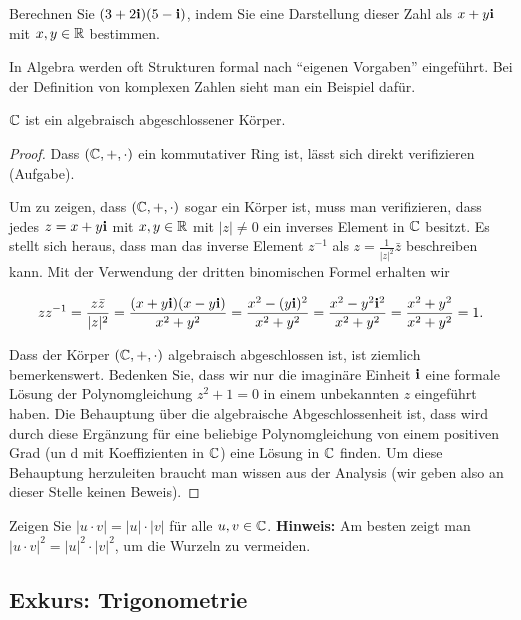 \begin{aufg}
	Berechnen Sie $(3+ 2 \mathbf{i}) ( 5 - \mathbf{i})$, indem Sie eine Darstellung dieser Zahl als $x+y \mathbf{i}$ mit $x, y \in \mathbb{R}$ bestimmen. 
\end{aufg} 

\begin{bem}
	In Algebra werden oft Strukturen formal nach ``eigenen Vorgaben'' eingeführt. Bei der Definition von komplexen Zahlen sieht man ein Beispiel dafür. 
\end{bem} 

\begin{thm}
		$\mathbb{C}$ ist ein algebraisch abgeschlossener Körper. 
\end{thm}
\begin{proof} 
	Dass $(\mathbb{C},+,\cdot)$ ein kommutativer Ring ist, lässt sich direkt verifizieren (Aufgabe). 
	
	Um zu zeigen, dass $(\mathbb{C},+,\cdot)$ sogar ein Körper ist, muss man verifizieren, dass jedes $z = x + y \mathbf{i}$ mit $x, y \in \mathbb{R}$ mit $|z| \ne 0$ ein inverses Element in $\mathbb{C}$ besitzt. Es stellt sich heraus, dass man das inverse Element $z^{-1}$ als $z = \frac{1}{|z|^2} \bar{z}$ beschreiben kann. Mit der Verwendung der dritten binomischen Formel erhalten wir 
	
	\[
		 	z z^{-1} = \frac{z \bar{z} }{|z|^2} = \frac{ ( x+ y \mathbf{i}) ( x - y\mathbf{i}) }{x^2 + y^2}   = \frac{ x^2 - (y \mathbf{i})^2 }{x^2 + y^2} = \frac{x^2 - y^2 \mathbf{i}^2}{x^2 + y^2} = \frac{x^2 + y^2}{x^2 + y^2} = 1. 
	\]
	
	Dass der Körper $(\mathbb{C},+,\cdot)$ algebraisch abgeschlossen ist, ist ziemlich bemerkenswert. Bedenken Sie, dass wir nur die imaginäre Einheit $\mathbf{i}$ eine formale Lösung der Polynomgleichung $z^2 + 1=0$ in einem unbekannten $z$ eingeführt haben. Die Behauptung über die algebraische Abgeschlossenheit ist, dass wird durch diese Ergänzung für eine beliebige Polynomgleichung von einem positiven Grad (un d mit Koeffizienten in $\mathbb{C}$) eine Lösung in $\mathbb{C}$ finden. Um diese Behauptung herzuleiten braucht man wissen aus der Analysis (wir geben also an dieser Stelle keinen Beweis). 
\end{proof} 

\begin{aufg}
	Zeigen Sie $|u \cdot v| = |u| \cdot |v|$ für alle $u, v \in \mathbb{C}$. \textbf{Hinweis:} Am besten zeigt man $|u \cdot v|^2 = |u|^2  \cdot |v|^2$, um die Wurzeln zu vermeiden. 
\end{aufg} 

\subsection{Exkurs: Trigonometrie} 

